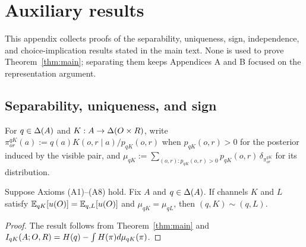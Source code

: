 \section{Auxiliary results}\label{app:auxiliary-results}

This appendix collects proofs of the separability, uniqueness, sign, independence, and
choice-implication results stated in the main text.  None is used to prove
Theorem~\ref{thm:main}; separating them keeps Appendices A and B focused on
the representation argument.

\subsection{Separability, uniqueness, and sign}

For $q\in\Delta(A)$ and $K:A\to\Delta(O\times R)$, write $\pi^{qK}_{or}(a):=q(a)K(o,r\mid a)/p_{qK}(o,r)$ when
$p_{qK}(o,r)>0$ for the posterior induced by the visible pair, and
$\mu_{qK}:=\sum_{(o,r):p_{qK}(o,r)>0}p_{qK}(o,r)\,\delta_{\pi^{qK}_{or}}$ for its distribution.

\begin{corollary}\label{cor:matching}
Suppose Axioms \textup{(A1)--(A8)} hold.  Fix $A$ and $q\in\Delta(A)$.  If channels $K$ and $L$ satisfy
$\mathbb E_{qK}[u(O)]=\mathbb E_{q,L}[u(O)]$ and $\mu_{qK}=\mu_{qL}$, then $(q,K)\sim(q,L)$.
\end{corollary}

\begin{proof}
The result follows from Theorem~\ref{thm:main} and
$I_{qK}(A;O,R)=H(q)-\int H(\pi)d\mu_{qK}(\pi)$.
\end{proof}

